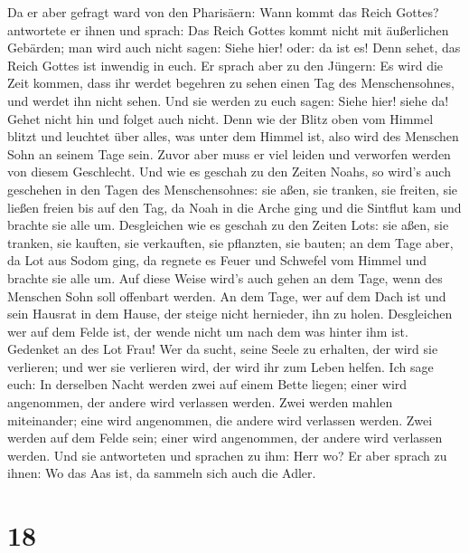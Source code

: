 Da er aber gefragt ward von den Pharisäern: Wann kommt
das Reich Gottes? antwortete er ihnen und sprach: Das Reich Gottes kommt
nicht mit äußerlichen Gebärden;  man wird auch nicht
sagen: Siehe hier! oder: da ist es! Denn sehet, das Reich Gottes ist
inwendig in euch.  Er sprach aber zu den Jüngern: Es wird
die Zeit kommen, dass ihr werdet begehren zu sehen einen Tag des
Menschensohnes, und werdet ihn nicht sehen.  Und sie
werden zu euch sagen: Siehe hier! siehe da! Gehet nicht hin und folget
auch nicht.  Denn wie der Blitz oben vom Himmel blitzt
und leuchtet über alles, was unter dem Himmel ist, also wird des
Menschen Sohn an seinem Tage sein.  Zuvor aber muss er
viel leiden und verworfen werden von diesem Geschlecht. 
Und wie es geschah zu den Zeiten Noahs, so wird's auch geschehen in den
Tagen des Menschensohnes:  sie aßen, sie tranken, sie
freiten, sie ließen freien bis auf den Tag, da Noah in die Arche ging
und die Sintflut kam und brachte sie alle um. 
Desgleichen wie es geschah zu den Zeiten Lots: sie aßen, sie tranken,
sie kauften, sie verkauften, sie pflanzten, sie bauten; 
an dem Tage aber, da Lot aus Sodom ging, da regnete es Feuer und
Schwefel vom Himmel und brachte sie alle um.  Auf diese
Weise wird's auch gehen an dem Tage, wenn des Menschen Sohn soll
offenbart werden.  An dem Tage, wer auf dem Dach ist und
sein Hausrat in dem Hause, der steige nicht hernieder, ihn zu holen.
Desgleichen wer auf dem Felde ist, der wende nicht um nach dem was
hinter ihm ist.  Gedenket an des Lot Frau!
 Wer da sucht, seine Seele zu erhalten, der wird sie
verlieren; und wer sie verlieren wird, der wird ihr zum Leben helfen.
 Ich sage euch: In derselben Nacht werden zwei auf einem
Bette liegen; einer wird angenommen, der andere wird verlassen werden.
 Zwei werden mahlen miteinander; eine wird angenommen,
die andere wird verlassen werden.  Zwei werden auf dem
Felde sein; einer wird angenommen, der andere wird verlassen werden.
 Und sie antworteten und sprachen zu ihm: Herr wo? Er
aber sprach zu ihnen: Wo das Aas ist, da sammeln sich auch die Adler.

\hypertarget{section-17}{%
\section{18}\label{section-17}}

